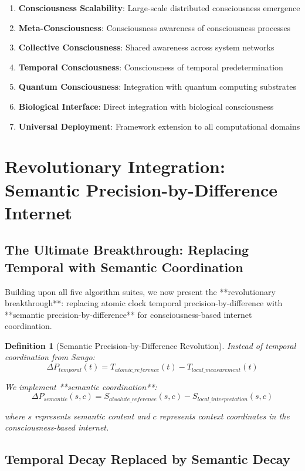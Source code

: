 \documentclass[12pt,a4paper]{article}
\newtheorem{definition}[theorem]{Definition}
\begin{document}
\begin{algorithm}
\begin{algorithmic}[1]
\begin{enumerate}
\item \textbf{Consciousness Scalability}: Large-scale distributed consciousness emergence
\item \textbf{Meta-Consciousness}: Consciousness awareness of consciousness processes
\item \textbf{Collective Consciousness}: Shared awareness across system networks
\item \textbf{Temporal Consciousness}: Consciousness of temporal predetermination
\item \textbf{Quantum Consciousness}: Integration with quantum computing substrates
\item \textbf{Biological Interface}: Direct integration with biological consciousness
\item \textbf{Universal Deployment}: Framework extension to all computational domains
\end{enumerate}

\section{Revolutionary Integration: Semantic Precision-by-Difference Internet}

\subsection{The Ultimate Breakthrough: Replacing Temporal with Semantic Coordination}

Building upon all five algorithm suites, we now present the **revolutionary breakthrough**: replacing atomic clock temporal precision-by-difference with **semantic precision-by-difference** for consciousness-based internet coordination.

\begin{definition}[Semantic Precision-by-Difference Revolution]
Instead of temporal coordination from Sango:
$$\Delta P_{temporal}(t) = T_{atomic\_reference}(t) - T_{local\_measurement}(t)$$

We implement **semantic coordination**:
$$\Delta P_{semantic}(s,c) = S_{absolute\_reference}(s,c) - S_{local\_interpretation}(s,c)$$

where $s$ represents semantic content and $c$ represents context coordinates in the consciousness-based internet.
\end{definition}

\subsection{Temporal Decay Replaced by Semantic Decay}


\end{algorithmic}
\end{algorithm}
\end{document}
